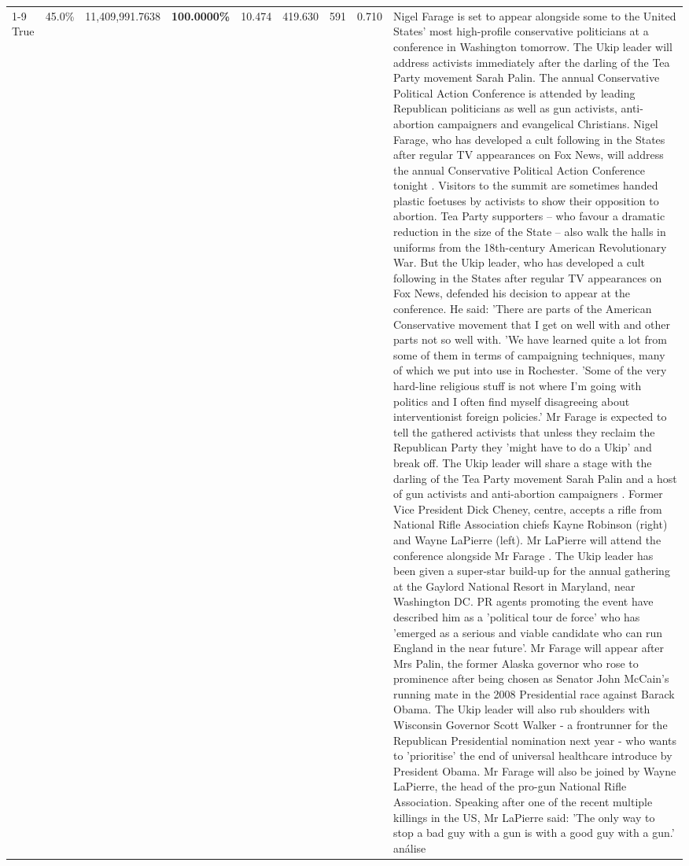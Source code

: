 \begin{table}[H]
\begin{tabular}{lllrlllll}
\cline{1-9}
True & 45.0\% & 11,409,991.7638 & \bfseries \color{red} 100.0000\% & 10.474 & 419.630 & 591 & 0.710 & Nigel Farage is set to appear alongside some to the United States' most high-profile conservative politicians at a conference in Washington tomorrow. The Ukip leader will address activists immediately after the darling of the Tea Party movement Sarah Palin. The annual Conservative Political Action Conference is attended by leading Republican politicians as well as gun activists, anti-abortion campaigners and evangelical Christians. Nigel Farage, who has developed a cult following in the States after regular TV appearances on Fox News, will address the annual Conservative Political Action Conference tonight . Visitors to the summit are sometimes handed plastic foetuses by activists to show their opposition to abortion. Tea Party supporters – who favour a dramatic reduction in the size of the State – also walk the halls in uniforms from the 18th-century American Revolutionary War. But the Ukip leader, who has developed a cult following in the States after regular TV appearances on Fox News, defended his decision to appear at the conference. He said: 'There are parts of the American Conservative movement that I get on well with and other parts not so well with. 'We have learned quite a lot from some of them in terms of campaigning techniques, many of which we put into use in Rochester. 'Some of the very hard-line religious stuff is not where I'm going with politics and I often find myself disagreeing about interventionist foreign policies.' Mr Farage is expected to tell the gathered activists that unless they reclaim the Republican Party they 'might have to do a Ukip' and break off. The Ukip leader will share a stage with the darling of the Tea Party movement Sarah Palin and a host of gun activists and anti-abortion campaigners . Former Vice President Dick Cheney, centre, accepts a rifle from National Rifle Association chiefs Kayne Robinson (right) and Wayne LaPierre (left). Mr LaPierre will attend the conference alongside Mr Farage . The Ukip leader has been given a super-star build-up for the annual gathering at the Gaylord National Resort in Maryland, near Washington DC. PR agents promoting the event have described him as a 'political tour de force' who has 'emerged as a serious and viable candidate who can run England in the near future'. Mr Farage will appear after Mrs Palin, the former Alaska governor who rose to prominence after being chosen as Senator John McCain's running mate in the 2008 Presidential race against Barack Obama. The Ukip leader will also rub shoulders with Wisconsin Governor Scott Walker - a frontrunner for the Republican Presidential nomination next year - who wants to 'prioritise' the end of universal healthcare introduce by President Obama. Mr Farage will also be joined by Wayne LaPierre, the head of the pro-gun National Rifle Association. Speaking after one of the recent multiple killings in the US, Mr LaPierre said: 'The only way to stop a bad guy with a gun is with a good guy with a gun.' análise \\

\end{tabular}
\end{table}
